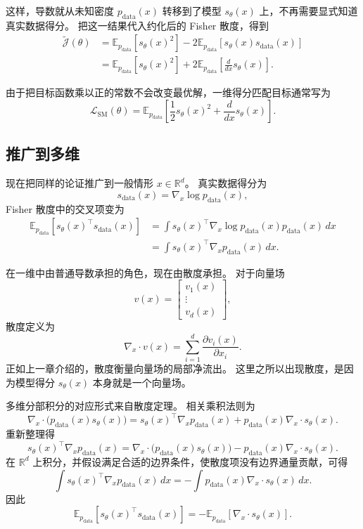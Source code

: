 这样，导数就从未知密度 $p_{\text{data}}(x)$ 转移到了模型 $s_\theta(x)$ 上，不再需要显式知道真实数据得分。
把这一结果代入约化后的 Fisher 散度，得到
\[
\begin{aligned}
\tilde{\mathcal{J}}(\theta)
&=
\mathbb{E}_{p_{\text{data}}}
\left[
s_\theta(x)^2
\right]
-
2
\mathbb{E}_{p_{\text{data}}}
\left[
s_\theta(x)s_{\text{data}}(x)
\right] \\[4pt]
&=
\mathbb{E}_{p_{\text{data}}}
\left[
s_\theta(x)^2
\right]
+
2
\mathbb{E}_{p_{\text{data}}}
\left[
\frac{d}{dx}s_\theta(x)
\right].
\end{aligned}
\]

由于把目标函数乘以正的常数不会改变最优解，一维得分匹配目标通常写为
\[
\boxed{
\mathcal{L}_{\text{SM}}(\theta)
=
\mathbb{E}_{p_{\text{data}}}
\left[
\frac{1}{2}s_\theta(x)^2
+
\frac{d}{dx}s_\theta(x)
\right].
}
\]

\subsection{推广到多维}

现在把同样的论证推广到一般情形 $x\in\mathbb{R}^d$。
真实数据得分为
\[
s_{\text{data}}(x)
=
\nabla_x\log p_{\text{data}}(x),
\]
Fisher 散度中的交叉项变为
\[
\begin{aligned}
\mathbb{E}_{p_{\text{data}}}
\left[
s_\theta(x)^\top s_{\text{data}}(x)
\right]
&=
\int
s_\theta(x)^\top
\nabla_x\log p_{\text{data}}(x)
p_{\text{data}}(x)
\,dx \\[4pt]
&=
\int
s_\theta(x)^\top
\nabla_x p_{\text{data}}(x)
\,dx.
\end{aligned}
\]

在一维中由普通导数承担的角色，现在由散度承担。
对于向量场
\[
v(x)=
\begin{bmatrix}
v_1(x)\\
\vdots\\
v_d(x)
\end{bmatrix},
\]
散度定义为
\[
\nabla_x\cdot v(x)
=
\sum_{i=1}^d
\frac{\partial v_i(x)}{\partial x_i}.
\]
正如上一章介绍的，散度衡量向量场的局部净流出。
这里之所以出现散度，是因为模型得分 $s_\theta(x)$ 本身就是一个向量场。

多维分部积分的对应形式来自散度定理。
相关乘积法则为
\[
\nabla_x\cdot
\bigl(p_{\text{data}}(x)s_\theta(x)\bigr)
=
s_\theta(x)^\top\nabla_x p_{\text{data}}(x)
+
p_{\text{data}}(x)\nabla_x\cdot s_\theta(x).
\]
重新整理得
\[
s_\theta(x)^\top\nabla_x p_{\text{data}}(x)
=
\nabla_x\cdot
\bigl(p_{\text{data}}(x)s_\theta(x)\bigr)
-
p_{\text{data}}(x)\nabla_x\cdot s_\theta(x).
\]
在 $\mathbb{R}^d$ 上积分，并假设满足合适的边界条件，使散度项没有边界通量贡献，可得
\[
\int
s_\theta(x)^\top\nabla_x p_{\text{data}}(x)
\,dx
=
-
\int
p_{\text{data}}(x)
\nabla_x\cdot s_\theta(x)
\,dx.
\]
因此
\[
\boxed{
\mathbb{E}_{p_{\text{data}}}
\left[
s_\theta(x)^\top s_{\text{data}}(x)
\right]
=
-
\mathbb{E}_{p_{\text{data}}}
\left[
\nabla_x\cdot s_\theta(x)
\right].
}
\]

